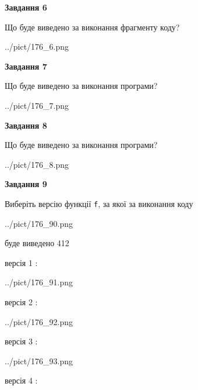 \documentclass[12pt, ukrainian]{article}
\def\code#1{\Verb!#1!}
\begin{document}
{\begin {large}
{\begin {center}\textbf{Завдання 6}\end {center}}

Що буде виведено за виконання фрагменту коду?\par
\begin{center}
	{../pict/176_6.png}
\end{center}
\newpage

{\begin {center}\textbf{Завдання 7}\end {center}}

Що буде виведено за виконання програми?\par
\begin{center}
	{../pict/176_7.png}
\end{center}
\newpage

{\begin {center}\textbf{Завдання 8}\end {center}}

Що буде виведено за виконання програми?\par
\begin{center}
	{../pict/176_8.png}
\end{center}
\newpage

{\begin {center}\textbf{Завдання 9}\end {center}}

Виберіть версію функції \code{f}, за якої за виконання коду
\begin{center}
	{../pict/176_90.png}
\end{center}
буде виведено 412

\vspace{5mm}
версія 1 :

\begin{center}
	{../pict/176_91.png}
\end{center}
версія 2 :

\begin{center}
	{../pict/176_92.png}
\end{center}
версія 3 :

\begin{center}
	{../pict/176_93.png}
\end{center}
версія 4 :


\end{large}}
\end{document}
